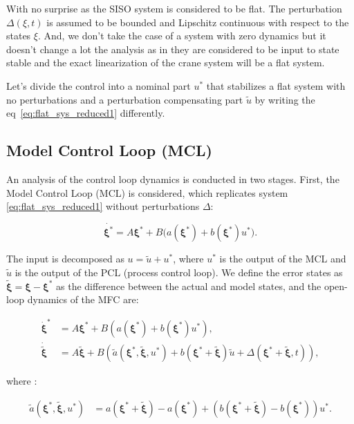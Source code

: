 With no surprise as the SISO system is considered to be flat. The perturbation \(\Delta(\xi, t)\) is assumed 
to be bounded and Lipschitz continuous with respect to the states \(\xi\). And, we don't take the case of a system
with zero dynamics but it doesn't change a lot the analysis as in \cite{Willkomm2023MFC} they are considered
to be input to state stable and the exact linearization of the crane system will be a flat system.

Let's divide the control into a nominal part \(u^*\) that stabilizes a flat system with no perturbations
and a perturbation compensating part \(\tilde{u}\) by writing the eq~\ref{eq:flat_sys_reduced1} differently.

\subsection{Model Control Loop (MCL)}

An analysis of the control loop dynamics is conducted in two stages. First, the Model Control 
Loop (MCL) is considered, which replicates system \eqref{eq:flat_sys_reduced1} without perturbations \(\Delta\):

\begin{equation}
    \label{eq:MCL_open_loop}
    \dot{\boldsymbol{\xi}^*} = A\boldsymbol{\xi}^* + B\big(a(\boldsymbol{\xi}^*) + b(\boldsymbol{\xi}^*)u^* \big).
\end{equation}

The input is decomposed as \(u = \tilde{u} + u^*\), where \(u^*\) is the output of the MCL and 
\(\tilde{u}\) is the output of the PCL (process control loop). We define the error states as 
\(\tilde{\boldsymbol{\xi}} = \boldsymbol{\xi} - \boldsymbol{\xi}^*\) as the difference between the actual and model states, and the open-loop 
dynamics of the MFC are:

\begin{align}
    \dot{\boldsymbol{\xi}}^* &= A\boldsymbol{\xi}^* + B \left( a(\boldsymbol{\xi}^*) + b(\boldsymbol{\xi}^*) u^* \right), \\
    \dot{\tilde{\boldsymbol{\xi}}} &= A\tilde{\boldsymbol{\xi}} + B \left( \tilde{a}(\boldsymbol{\xi}^*, \tilde{\boldsymbol{\xi}}, u^*) + b(\boldsymbol{\xi}^* + \tilde{\boldsymbol{\xi}}) \tilde{u} + \Delta(\boldsymbol{\xi}^* + \tilde{\boldsymbol{\xi}}, t)  \right),
\end{align}

where :

\begin{align}
    \tilde{a}(\boldsymbol{\xi}^*, \tilde{\boldsymbol{\xi}}, u^*) &= a(\boldsymbol{\xi}^* + \tilde{\boldsymbol{\xi}}) - a(\boldsymbol{\xi}^*) + \left( b(\boldsymbol{\xi}^* + \tilde{\boldsymbol{\xi}}) - b(\boldsymbol{\xi}^*) \right) u^*.
\end{align}

